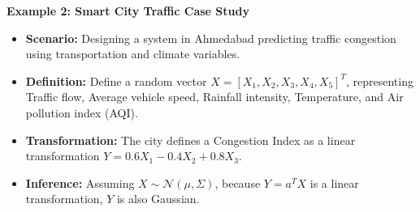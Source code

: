 \documentclass[12pt]{article}
\begin{document}
\textbf{Example 2: Smart City Traffic Case Study}
\begin{itemize}
    \item \textbf{Scenario:} Designing a system in Ahmedabad predicting traffic congestion using transportation and climate variables.
    \item \textbf{Definition:} Define a random vector $X = [X_1, X_2, X_3, X_4, X_5]^T$, representing Traffic flow, Average vehicle speed, Rainfall intensity, Temperature, and Air pollution index (AQI).
    \item \textbf{Transformation:} The city defines a Congestion Index as a linear transformation $Y = 0.6X_1 - 0.4X_2 + 0.8X_3$.
    \item \textbf{Inference:} Assuming $X \sim \mathcal{N}(\mu, \Sigma)$, because $Y = a^T X$ is a linear transformation, $Y$ is also Gaussian.
\end{itemize}
\end{document}
